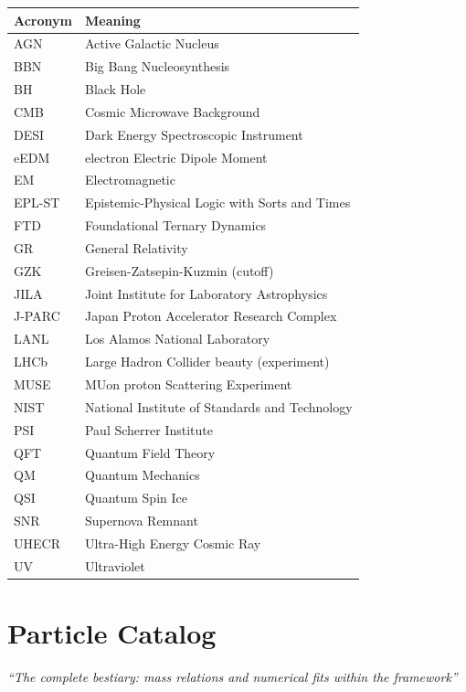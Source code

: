 \documentclass[
  11pt,
  letterpaper,
  twoside,
  openright]{book}
\begin{document}
\begin{longtable}[]{@{}ll@{}}
\toprule\noalign{}
Acronym & Meaning \\
\midrule\noalign{}
\endhead
\bottomrule\noalign{}
\endlastfoot
AGN & Active Galactic Nucleus \\
BBN & Big Bang Nucleosynthesis \\
BH & Black Hole \\
CMB & Cosmic Microwave Background \\
DESI & Dark Energy Spectroscopic Instrument \\
eEDM & electron Electric Dipole Moment \\
EM & Electromagnetic \\
EPL-ST & Epistemic-Physical Logic with Sorts and Times \\
FTD & Foundational Ternary Dynamics \\
GR & General Relativity \\
GZK & Greisen-Zatsepin-Kuzmin (cutoff) \\
JILA & Joint Institute for Laboratory Astrophysics \\
J-PARC & Japan Proton Accelerator Research Complex \\
LANL & Los Alamos National Laboratory \\
LHCb & Large Hadron Collider beauty (experiment) \\
MUSE & MUon proton Scattering Experiment \\
NIST & National Institute of Standards and Technology \\
PSI & Paul Scherrer Institute \\
QFT & Quantum Field Theory \\
QM & Quantum Mechanics \\
QSI & Quantum Spin Ice \\
SNR & Supernova Remnant \\
UHECR & Ultra-High Energy Cosmic Ray \\
UV & Ultraviolet \\
\end{longtable}

\chapter{Particle Catalog}\label{sec-particle-catalog}

\emph{``The complete bestiary: mass relations and numerical fits within
the framework''}
\end{document}
